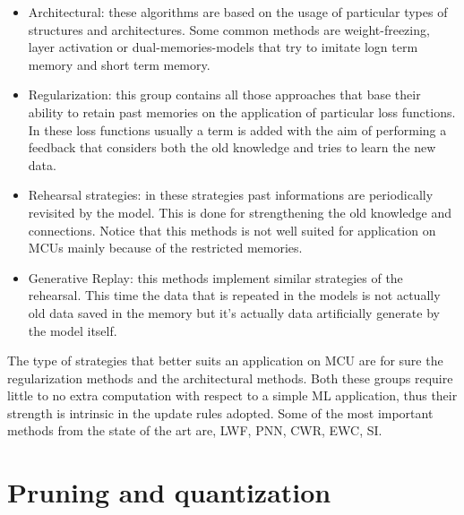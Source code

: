 \documentclass[12pt]{report}
\begin{document}
\begin{itemize}
\item Architectural: these algorithms are based on the usage of particular types of structures and architectures. Some common methods are weight-freezing, layer activation or dual-memories-models that try to imitate logn term memory and short term memory.
\item Regularization: this group contains all those approaches that base their ability to retain past memories on the application of particular loss functions. In these loss functions usually a term is added with the aim of performing a feedback that considers both the old knowledge and tries to learn the new data.
\item Rehearsal strategies: in these strategies past informations are periodically revisited by the model. This is done for strengthening the old knowledge and connections. Notice that this methods is not well suited for application on MCUs mainly because of the restricted memories. 
\item Generative Replay: this methods implement similar strategies of the rehearsal. This time the data that is repeated in the models is not actually old data saved in the memory but it's actually data artificially generate by the model itself. 
\end{itemize} 

The type of strategies that better suits an application on MCU are for sure the regularization methods and the architectural methods. Both these groups require little to no extra computation with respect to a simple ML application, thus their strength is intrinsic in the update rules adopted. Some of the most important methods from the state of the art are, LWF, PNN, CWR, EWC, SI. 



\section{Pruning and quantization}
\end{document}
